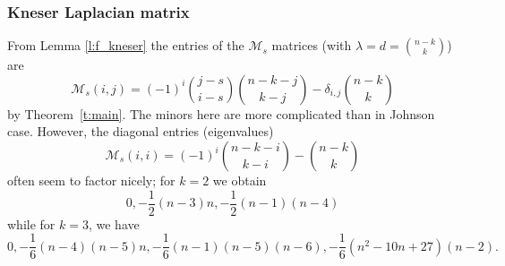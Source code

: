 \documentclass[11pt]{article}
\theoremstyle{definition}
\numberwithin{equation}{section}
\numberwithin{equation}{section}
\newcommand{\M}{\mathcal{M}}
\begin{document}
\subsubsection{Kneser Laplacian matrix}

From Lemma \ref{l:f_kneser} the entries of the $\M_s$ matrices (with $\lambda = d = \binom{n-k}{k}$) are
\[ \M_s(i,j) = (-1)^i\binom{j-s}{i-s} \binom{n-k-j}{k-j} - \delta_{i,j} \binom{n-k}{k} \]
by Theorem~\ref{t:main}.  The minors here are more complicated than in Johnson case.
However, the diagonal entries (eigenvalues)
\[ \M_s(i,i) = (-1)^i \binom{n-k-i}{k-i} - \binom{n-k}{k}  \]
often seem to factor nicely; for $k = 2$ we obtain
\[ 0, -\frac{1}{2}(n-3)n, -\frac{1}{2}(n-1)(n-4) \]
while for $k = 3$, we have
\[ 0, -\frac{1}{6}(n-4)(n-5)n, -\frac{1}{6}(n-1)(n-5)(n-6), -\frac{1}{6}(n^2 - 10n + 27)(n-2). \]
\end{document}
